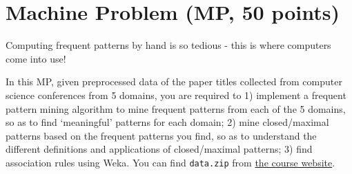 \section*{Machine Problem (MP, 50 points)}
Computing frequent patterns by hand is so tedious - this is where computers come into use! 

In this MP, given preprocessed data of the paper titles collected from computer science conferences from 5 domains, you are required to 1) implement a frequent pattern mining algorithm to mine frequent patterns from each of the 5 domains, so as to find `meaningful' patterns for each domain;  2) mine closed/maximal patterns based on the frequent patterns you find, so as to understand the different definitions and applications of closed/maximal patterns; 3) find association rules using Weka. You can find {\tt data.zip} from \href{https://wiki.cites.illinois.edu/wiki/display/cs412fa15/Assignments}{the course website}.\\ 

